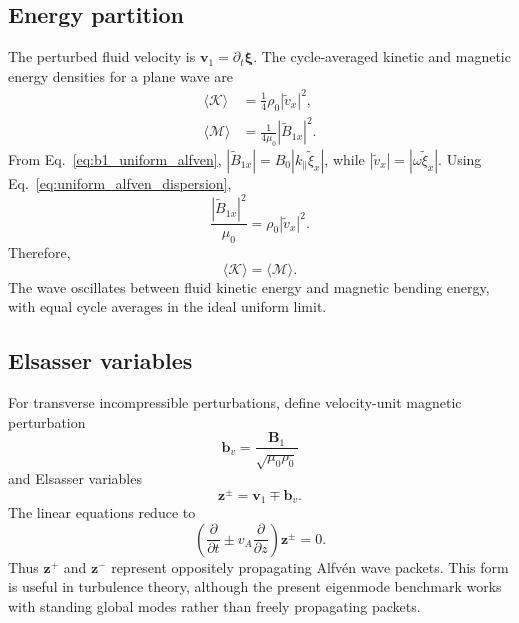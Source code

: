 \subsection{Energy partition}
The perturbed fluid velocity is $\mathbf v_1=\partial_t\boldsymbol\xi$. The cycle-averaged kinetic and magnetic energy densities for a plane wave are
\begin{align}
\langle\mathcal K\rangle
&=\frac{1}{4}\rho_0|\widetilde v_x|^2,\\
\langle\mathcal M\rangle
&=\frac{1}{4\mu_0}|\widetilde B_{1x}|^2.
\end{align}
From Eq.~\eqref{eq:b1_uniform_alfven}, $|\widetilde B_{1x}|=B_0|k_\parallel\widetilde\xi_x|$, while $|\widetilde v_x|=|\omega\widetilde\xi_x|$. Using Eq.~\eqref{eq:uniform_alfven_dispersion},
\begin{equation}
\frac{|\widetilde B_{1x}|^2}{\mu_0}
=\rho_0|\widetilde v_x|^2.
\end{equation}
Therefore,
\begin{equation}
\boxed{\langle\mathcal K\rangle=\langle\mathcal M\rangle.}
\end{equation}
The wave oscillates between fluid kinetic energy and magnetic bending energy, with equal cycle averages in the ideal uniform limit.

\subsection{Elsasser variables}
For transverse incompressible perturbations, define velocity-unit magnetic perturbation
\begin{equation}
\mathbf b_v=\frac{\mathbf B_1}{\sqrt{\mu_0\rho_0}}
\end{equation}
and Elsasser variables
\begin{equation}
\mathbf z^\pm=\mathbf v_1\mp\mathbf b_v.
\end{equation}
The linear equations reduce to
\begin{equation}
\left(\frac{\partial}{\partial t}\pm v_A\frac{\partial}{\partial z}\right)\mathbf z^\pm=0.
\end{equation}
Thus $\mathbf z^+$ and $\mathbf z^-$ represent oppositely propagating Alfv\'en wave packets. This form is useful in turbulence theory, although the present eigenmode benchmark works with standing global modes rather than freely propagating packets.

